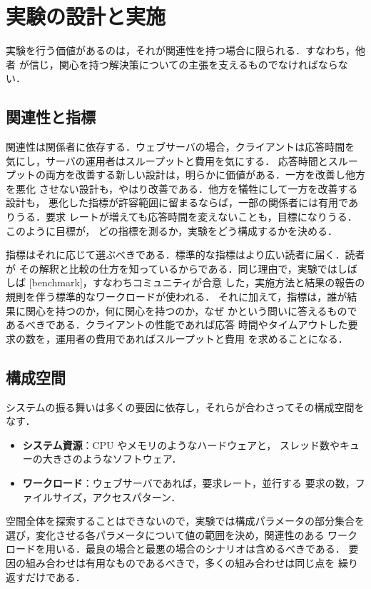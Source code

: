 \documentclass[../main.tex]{subfiles}
\begin{document}
\section{実験の設計と実施}
\label{sec:l06-design}

実験を行う価値があるのは，それが関連性を持つ場合に限られる．すなわち，他者
が信じ，関心を持つ解決策についての主張を支えるものでなければならない．

\subsection{関連性と指標}

関連性は関係者に依存する．ウェブサーバの場合，クライアントは応答時間を
気にし，サーバの運用者はスループットと費用を気にする．%
%
応答時間とスループットの両方を改善する新しい設計は，明らかに価値がある．一方を改善し他方を悪化
させない設計も，やはり改善である．他方を犠牲にして一方を改善する設計も，
悪化した指標が許容範囲に留まるならば，一部の関係者には有用でありうる．要求
レートが増えても応答時間を変えないことも，目標になりうる．このように目標が，
どの指標を測るか，実験をどう構成するかを決める．

指標はそれに応じて選ぶべきである．標準的な指標はより広い読者に届く．読者が
その解釈と比較の仕方を知っているからである．同じ理由で，実験ではしばしば
[benchmark]，すなわちコミュニティが合意
した，実施方法と結果の報告の規則を伴う標準的なワークロードが使われる．
それに加えて，指標は，誰が結果に関心を持つのか，何に関心を持つのか，なぜ
かという問いに答えるものであるべきである．クライアントの性能であれば応答
時間やタイムアウトした要求の数を，運用者の費用であればスループットと費用
を求めることになる．

\subsection{構成空間}

システムの振る舞いは多くの要因に依存し，それらが合わさってその構成空間を
なす．
\begin{itemize}
  \item \textbf{システム資源}：CPU やメモリのようなハードウェアと，
    スレッド数やキューの大きさのようなソフトウェア．
  \item \textbf{ワークロード}：ウェブサーバであれば，要求レート，並行する
    要求の数，ファイルサイズ，アクセスパターン．
\end{itemize}
空間全体を探索することはできないので，実験では構成パラメータの部分集合を
選び，変化させる各パラメータについて値の範囲を決め，関連性のある
ワークロードを用いる．最良の場合と最悪の場合のシナリオは含めるべきである．
要因の組み合わせは有用なものであるべきで，多くの組み合わせは同じ点を
繰り返すだけである．
\end{document}
